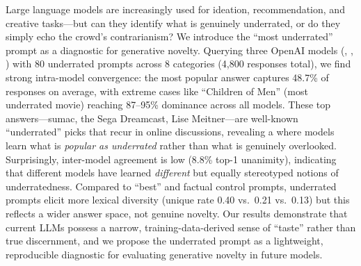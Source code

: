 Large language models are increasingly used for ideation, recommendation, and creative tasks---but can they identify what is genuinely underrated, or do they simply echo the crowd's contrarianism? We introduce the ``most underrated'' prompt as a diagnostic for generative novelty. Querying three OpenAI models (\gptfull, \gptmini, \gptfo) with 80 underrated prompts across 8 categories (4,800 responses total), we find strong intra-model convergence: the most popular answer captures 48.7\% of responses on average, with extreme cases like ``Children of Men'' (most underrated movie) reaching 87--95\% dominance across all models. These top answers---sumac, the Sega Dreamcast, Lise Meitner---are well-known ``underrated'' picks that recur in online discussions, revealing a \metapop where models learn what is \emph{popular as underrated} rather than what is genuinely overlooked. Surprisingly, inter-model agreement is low (8.8\% top-1 unanimity), indicating that different models have learned \emph{different} but equally stereotyped notions of underratedness. Compared to ``best'' and factual control prompts, underrated prompts elicit more lexical diversity (unique rate 0.40 vs.\ 0.21 vs.\ 0.13) but this reflects a wider answer space, not genuine novelty. Our results demonstrate that current LLMs possess a narrow, training-data-derived sense of ``taste'' rather than true discernment, and we propose the underrated prompt as a lightweight, reproducible diagnostic for evaluating generative novelty in future models.
